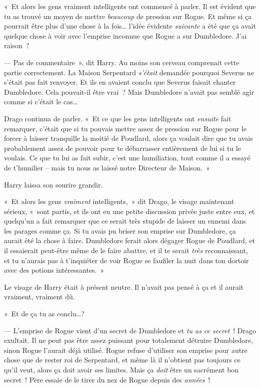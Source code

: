 «~Et alors les gens vraiment intelligents ont commencé à parler. Il est évident que tu as trouvé un moyen de mettre \emph{beaucoup} de pression sur Rogue. Et même si ça pourrait être plus d'une chose à la fois… l'idée évidente \emph{suivante} a été que ça avait quelque chose à voir avec l'emprise inconnue que Rogue a sur Dumbledore. J'ai raison~?

--- Pas de commentaire~», dit Harry. Au moins son cerveau comprenait cette partie correctement. La Maison Serpentard \emph{s'était} demandée pourquoi Severus ne s'était pas fait renvoyer. Et ils en avaient conclu que Severus faisait chanter Dumbledore. Cela pouvait-il être vrai~? Mais Dumbledore n'avait pas semblé agir comme si c'était le cas…

Drago continua de parler. «~Et ce que les gens intelligents ont \emph{ensuite} fait remarquer, c'était que si tu pouvais mettre assez de pression sur Rogue pour le forcer à laisser tranquille la moitié de Poudlard, alors ça voulait dire que tu avais probablement assez de pouvoir pour te débarrasser entièrement de lui si tu le voulais. Ce que tu lui as fait subir, c'est une humiliation, tout comme il a essayé de t'humilier -- mais tu nous as laissé notre Directeur de Maison.~»

Harry laissa son sourire grandir.

«~Et alors les gens \emph{vraiment} intelligents,~» dit Drago, le visage maintenant sérieux, «~sont partis, et ils ont eu une petite discussion privée juste entre eux, et quelqu'un a fait remarquer que ce serait très stupide de laisser un ennemi dans les parages comme ça. Si tu avais pu briser son emprise sur Dumbledore, ça aurait été la chose à faire. Dumbledore ferait alors dégager Rogue de Poudlard, et il essaierait peut-être même de le faire abattre, et il te serait \emph{très} reconnaissant, et tu n'aurais pas à t'inquiéter de voir Rogue se faufiler la nuit dans ton dortoir avec des potions intéressantes.~»

Le visage de Harry était à présent neutre. Il n'avait pas pensé à ça et il aurait vraiment, vraiment dû.

«~Et de ça tu as conclu…?

--- L'emprise de Rogue vient d'un secret de Dumbledore et \emph{tu as ce secret}~! Drago exultait. Il ne peut pas être assez puissant pour totalement détruire Dumbledore, sinon Rogue l'aurait déjà utilisé. Rogue refuse d'utiliser son emprise pour autre chose que de rester roi de Serpentard, et même là il n'obtient pas toujours ce qu'il veut, alors ça doit avoir ses limites. Mais ça \emph{doit} être un sacrément bon secret~! Père essaie de le tirer du nez de Rogue depuis des \emph{années}~!

